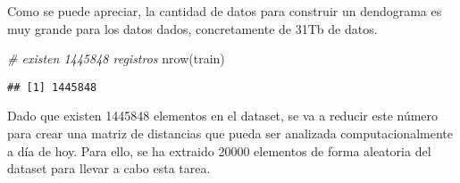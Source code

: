 \documentclass[
]{article}
\newenvironment{Shaded}{\begin{snugshade}}{\end{snugshade}}
\newcommand{\AttributeTok}[1]{\textcolor[rgb]{0.77,0.63,0.00}{#1}}
\newcommand{\CommentTok}[1]{\textcolor[rgb]{0.56,0.35,0.01}{\textit{#1}}}
\newcommand{\DecValTok}[1]{\textcolor[rgb]{0.00,0.00,0.81}{#1}}
\newcommand{\FunctionTok}[1]{\textcolor[rgb]{0.00,0.00,0.00}{#1}}
\newcommand{\NormalTok}[1]{#1}
\newcommand{\OtherTok}[1]{\textcolor[rgb]{0.56,0.35,0.01}{#1}}
\newcommand{\SpecialCharTok}[1]{\textcolor[rgb]{0.00,0.00,0.00}{#1}}
\begin{document}
\begin{Shaded}
\end{Shaded}

Como se puede apreciar, la cantidad de datos para construir un
dendograma es muy grande para los datos dados, concretamente de 31Tb de
datos.

\begin{Shaded}
\begin{Highlighting}[]
\CommentTok{\# existen 1445848 registros}
\FunctionTok{nrow}\NormalTok{(train)}
\end{Highlighting}
\end{Shaded}

\begin{verbatim}
## [1] 1445848
\end{verbatim}

Dado que existen 1445848 elementos en el dataset, se va a reducir este
número para crear una matriz de distancias que pueda ser analizada
computacionalmente a día de hoy. Para ello, se ha extraido 20000
elementos de forma aleatoria del dataset para llevar a cabo esta tarea.

\begin{Shaded}
\end{Shaded}
\end{document}
